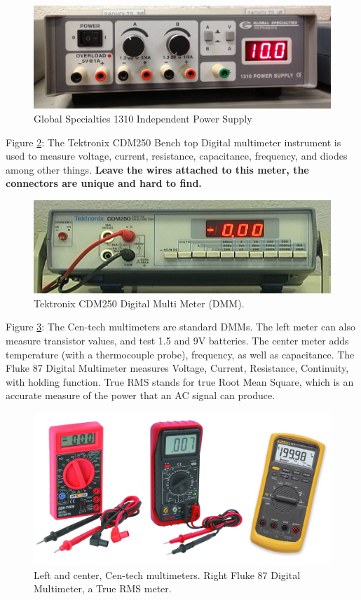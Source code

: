 \documentclass[11pt,letterpaper]{article}
\begin{document}
\begin{figure}
\centering
\includegraphics[width=0.7\linewidth]{Lab2_GlobalSpecialties1310}
\caption{Global Specialties 1310 Independent Power Supply}
\label{fig:Lab2_GlobalSpecialties1310}
\end{figure}

Figure \ref{fig:Lab2_TektronixCDM2050DigitalMultimeter}: The Tektronix CDM250 Bench top Digital multimeter instrument is used to measure voltage, current, resistance, capacitance, frequency, and diodes among other things. \textbf{Leave the wires attached to this meter, the connectors are unique and hard to find.}\\

\begin{figure}
\centering
\includegraphics[width=0.7\linewidth]{Lab2_TektronixCDM2050DigitalMultimeter}
\caption{Tektronix CDM250 Digital Multi Meter (DMM).}
\label{fig:Lab2_TektronixCDM2050DigitalMultimeter}
\end{figure}


Figure \ref{fig:Lab2_Multimeters}: The Cen-tech multimeters are standard DMMs. The left meter can also measure transistor values, and test 1.5 and 9V batteries. The center meter adds temperature (with a thermocouple probe), frequency, as well as capacitance. The Fluke 87 Digital Multimeter measures Voltage, Current, Resistance, Continuity, with holding function.  True RMS stands for true Root Mean Square, which is an accurate measure of the power that an AC signal can produce.\\

\begin{figure}
\centering
\includegraphics[width=0.7\linewidth]{Lab2_Multimeters}
\caption{Left and center, Cen-tech multimeters. Right Fluke 87 Digital Multimeter, a True RMS meter.}
\label{fig:Lab2_Multimeters}
\end{figure}
\end{document}
